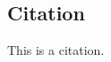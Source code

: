 \documentclass{article}
\begin{document}
\subsection{Citation}

This is a citation\cite{Eg}.

\newpage





\end{document}
